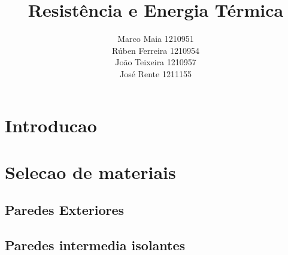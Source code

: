 \documentclass[12pt, a4paper]{article}
\title{
    Resistência e Energia {\textemdash} T\'ermica
}
\author{
    Marco Maia          {\textemdash}    1210951\\
    R\'uben Ferreira    {\textemdash}    1210954\\
    Jo\~ao Teixeira     {\textemdash}    1210957\\
    Jos\'e Rente        {\textemdash}    1211155\\
}
\begin{document}
\makeatletter
{}
\makeatother
\thispagestyle{empty}
\newpage

\tableofcontents
\printindex
\newpage

\section{Introducao}\label{sec:intro}


\section{Selecao de materiais}\label{sec:select}


\subsection{Paredes Exteriores}\label{sub:Paredes Exteriores}



\subsection{Paredes intermedia isolantes}\label{sub:Paredes intermedia isolantes}
\end{document}
